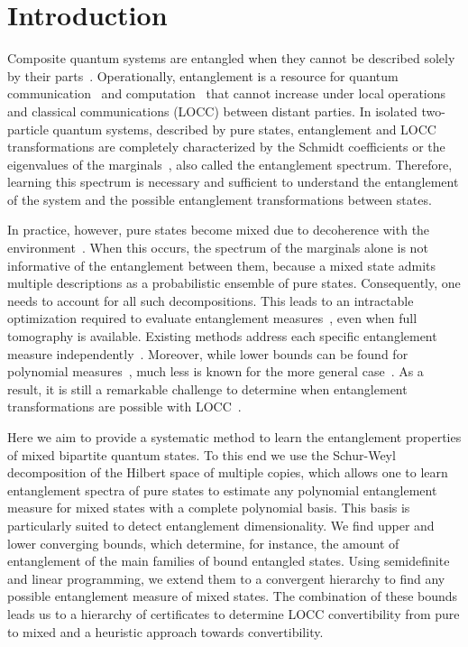 \documentclass[aps,pra,twocolumn,superscriptaddress]{revtex4-2}
\begin{document}
\section{Introduction}
Composite quantum systems are entangled when they cannot be described solely by their parts~\cite{epr}. Operationally, entanglement is a resource for quantum communication~\cite{distributed, eckert} and computation~\cite{one-way, shor} that cannot increase under local operations and classical communications (LOCC) between distant parties.
In isolated two-particle quantum systems, described by pure states, entanglement and LOCC transformations are completely characterized by
the Schmidt coefficients or the eigenvalues of the marginals~\cite{Nielsen1999MajLOCC, Vidal_2000}, also called
the entanglement spectrum. Therefore, learning this spectrum is
necessary and sufficient to understand the entanglement of the
system and the possible entanglement transformations between
states.

In practice, however, pure states become mixed due to decoherence with the environment~\cite{Zurek2003,BreuerPetruccione2002,NielsenChuang2010}. When this occurs, the spectrum of the marginals alone is not informative of the entanglement between them, because a mixed state admits multiple descriptions as a probabilistic ensemble of pure states. Consequently,
one needs to account for all such decompositions. This leads to an intractable optimization required to evaluate entanglement measures~\cite{Bennett1996EoF, Uhlmann1998, Uhlmann2010Roofs, Horodecki2009RMP}, even when full tomography is available.
Existing methods address each specific entanglement measure independently~\cite{Wootters1998, TerhalVollbrecht2000, VollbrechtWerner2001, Mintert2004Concurrence, Chen2005Concurrence, Chen2005EoF, Guhne2007Estimating, Eisert2007QuantWitness}. Moreover, while lower bounds can be found for polynomial measures~\cite{Toth2015CroofTP}, much less is known for the more general case~\cite{PlenioVirmani2007}. As a result, it is still a remarkable challenge to determine when entanglement transformations are possible with LOCC~\cite{Gour2005InfiniteConditions, Chitambar2014LOCC, Sauerwein_2018}.

Here we aim to provide a systematic method to learn the entanglement properties of mixed bipartite quantum states.
To this end we use the Schur-Weyl decomposition of the Hilbert space of multiple copies, which allows one
to learn entanglement spectra of pure states \cite{Alicki1988, Keyl2001EstimatingSpectrum} to estimate any polynomial entanglement measure for mixed states with a complete polynomial basis. This basis is particularly suited to detect entanglement dimensionality. We find upper and lower converging bounds, which determine, for instance, the amount of entanglement of the main families of bound entangled states. Using semidefinite and linear programming, we extend them to a convergent hierarchy to find any possible entanglement measure of mixed states.
The combination of these bounds leads us to a hierarchy of certificates to determine LOCC convertibility from pure to mixed and a heuristic approach towards convertibility.
\end{document}
